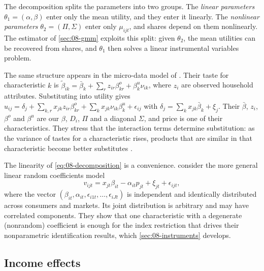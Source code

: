 The decomposition splits the parameters into two groups. The \emph{linear parameters}
$\theta_1 = (\alpha, \beta)$ enter only the mean utility, and they enter it linearly. The \emph{nonlinear
parameters} $\theta_2 = (\Pi, \Sigma)$ enter only $\mu_{ijt}$, and shares depend on them nonlinearly. The
estimator of \cref{sec:08-gmm} exploits this split: given $\theta_2$, the mean utilities can be recovered from
shares, and $\theta_1$ then solves a linear instrumental variables problem.

The same structure appears in the micro-data model of \citet[eqs.~(1)--(4)]{BerryLevinsohnPakes2004}. Their
taste for characteristic $k$ is $\tilde\beta_{ik} = \bar\beta_k + \sum_r z_{ir}\beta^o_{kr} +
\beta^u_k\nu_{ik}$, where $z_i$ are observed household attributes. Substituting into utility gives
$u_{ij} = \delta_j + \sum_{k,r} x_{jk} z_{ir}\beta^o_{kr} + \sum_k x_{jk}\nu_{ik}\beta^u_k + \epsilon_{ij}$
with $\delta_j = \sum_k x_{jk}\bar\beta_k + \xi_j$. Their $\bar\beta$, $z_i$, $\beta^o$ and $\beta^u$ are our
$\beta$, $D_i$, $\Pi$ and a diagonal $\Sigma$, and price is one of their characteristics. They stress that the interaction terms
determine substitution: as the variance of tastes for a characteristic rises, products that are similar in
that characteristic become better substitutes \citep[p.~72]{BerryLevinsohnPakes2004}.

The linearity of \eqref{eq:08-decomposition} is a convenience. \citet[Example~1]{BerryHaile2014} consider
the more general linear random coefficients model
\begin{equation}\label{eq:08-bh-example}
  v_{ijt} = x_{jt}\beta_{it} - \alpha_{it} p_{jt} + \xi_{jt} + \epsilon_{ijt},
\end{equation}
where the vector $(\beta_{it}, \alpha_{it}, \epsilon_{i1t}, \dots, \epsilon_{iJt})$ is independent and
identically distributed across consumers and markets. Its joint distribution is arbitrary and may have
correlated components. They show that one characteristic with a degenerate (nonrandom) coefficient is enough
for the index restriction that drives their nonparametric identification results, which
\cref{sec:08-instruments} develops.

\subsection{Income effects}\label{sec:08-income}

